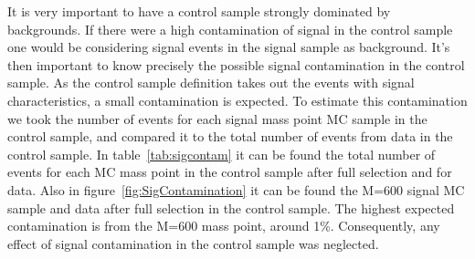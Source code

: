 It is very important to have a control sample strongly dominated by backgrounds. If there were a high contamination of signal in the control sample one would be considering signal events in the signal sample as background. It's then important to know precisely the possible signal contamination in the control sample. As the control sample definition takes out the events with signal characteristics, a small contamination is expected. To estimate this contamination we took the number of events for each signal mass point MC sample in the control sample, and compared it to the total number of events from data in the control sample. In table~\ref{tab:sigcontam} it can be found the total number of events for each MC mass point in the control sample after full selection and for data. Also in figure~\ref{fig:SigContamination} it can be found the M=600 \GeVcc signal MC sample and data after full selection in the control sample. The highest expected contamination is from the M=600 \GeVcc mass point, around 1\%. Consequently, any effect of signal contamination in the control sample was neglected. 

\begin{table}[htbH]
\begin{center}
\caption{Number of events in the control sample for MC signal samples and data after full selection. The contamination is evaluated as the ratio of the number of events in the control sample for each mass point and data. \label{tab:sigcontam}}
\end{center}
\end{table}

